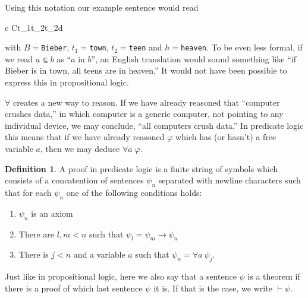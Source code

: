 \documentclass[11pt,oneside,%
]{memoir}
\newenvironment{eqna}{\begin{IEEEeqnarray}{c}}{\end{IEEEeqnarray}\ignorespacesafterend}
\theoremstyle{definition}
\newtheorem{maaritelma}{Definition}
\newcommand{\joukk}{\lstinline[language=joukko]}
\begin{document}
Using this notation our example sentence would read
\begin{eqna}
    C\Subset t_1\rightarrow\forall t_2\:t_2\in d
\end{eqna}
with \(B=\)\joukk!Bieber!, \(t_1=\)\joukk!town!, \(t_2=\)\joukk!teen! and \(h=\)\joukk!heaven!. To be even less formal, if we read \(a\Subset b\) as ``\(a\) in \(b\)'', an English translation would sound something like ``if Bieber is in town, all teens are in heaven.'' It would not have been possible to express this in propositional logic.


\(\forall\) creates a new way to reason. If we have already reasoned that ``computer crushes data,'' in which computer is a generic computer, not pointing to any individual device, we may conclude, ``all computers crush data.'' In predicate logic this means that if we have already reasoned \(\varphi\) which has (or hasn't) a free variable \(a\), then we may deduce \(\forall a\;\varphi\).

\begin{maaritelma}
A proof in predicate logic is a finite string of symbols which consists of a concatention of sentences \(\psi_n\) separated with newline characters such that for each \(\psi_n\) one of the following conditions holds:
\begin{enumerate}
    \item \(\psi_n\) is an axiom
    \item There are \(l,m<n\) such that \(\psi_l=\psi_m\rightarrow\psi_n\)
    \item There is \(j<n\) and a variable \(a\) such that \(\psi_n=\forall a\:\psi_j\).
\end{enumerate}
\end{maaritelma}
Just like in propositional logic, here we also say that a sentence \(\psi\) is a theorem if there is a proof of which last sentence \(\psi\) it is. If that is the case, we write \(\vdash\psi\).

\end{document}
